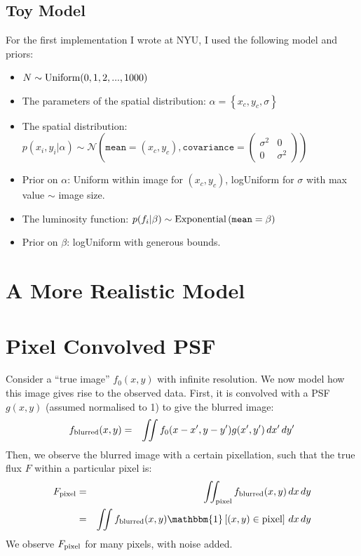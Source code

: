 \documentclass[letterpaper, 11pt]{article}
\begin{document}
\subsection{Toy Model}
For the first implementation I wrote at NYU, I used the following model and
priors:
\begin{itemize}
\item $N \sim \textnormal{Uniform}(0, 1, 2, ..., 1000)$ \\
\item The parameters of the spatial
distribution: $\alpha = \left\{x_c, y_c, \sigma\right\}$ \\
\item The spatial distribution: $p(x_i, y_i | \alpha)\sim\mathcal{N}\left(
\texttt{mean}=(x_c, y_c), \texttt{covariance}=
\left(\begin{array}{cc}\sigma^2 & 0 \\ 0 & \sigma^2\end{array}\right)\right)$ \\
\item Prior on $\alpha$: Uniform within image for $(x_c, y_c)$, logUniform for
$\sigma$ with max value $\sim$ image size.
\item The luminosity function: $p(f_i | \beta) \sim
\textnormal{Exponential}\left(\texttt{mean}=\beta\right)$ \\
\item Prior on $\beta$: logUniform with generous bounds.
\end{itemize}



\section{A More Realistic Model}
\citep{2008ApJ...682..874K}

\appendix
\section{Pixel Convolved PSF}
Consider a ``true image'' $f_0(x, y)$ with infinite resolution. We now model how
this image gives rise to the observed data. First, it is convolved with a
PSF $g(x, y)$ (assumed normalised to 1) to give the blurred image:
\begin{eqnarray}
f_{\rm{blurred}}(x, y) &=& \iint f_0(x-x', y-y')
g(x', y') \, dx' \, dy' \label{blur}
\end{eqnarray}
Then, we observe the blurred image with a certain pixellation, such that
the true flux $F$ within a particular pixel is:
\begin{eqnarray}
F_{\rm{pixel}} &=& \iint_{\rm{pixel}} f_{\rm blurred}(x, y) \,dx\,dy\\
&=& \iint f_{\rm blurred}(x, y)\mathbbm{1}\left[(x,y) \in \textnormal{pixel}
\right] \,dx\,dy \label{pixel}
\end{eqnarray}
We observe $F_{\rm{pixel}}$ for many pixels, with noise added.
\end{document}
